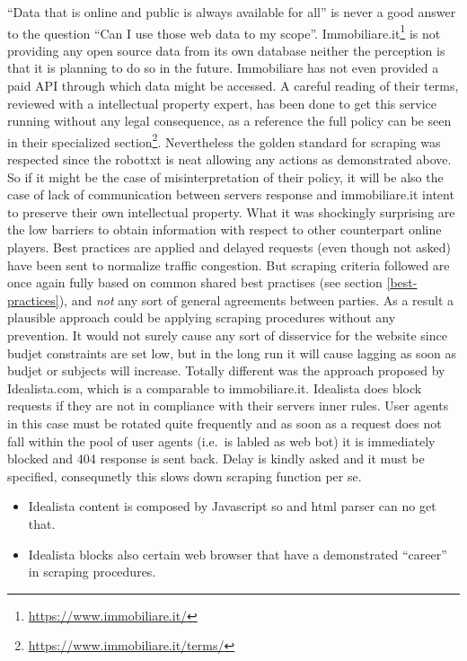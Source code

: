\documentclass[
  12pt,
  a4paper,
  oneside]{book}
\DeclareRobustCommand{\href}[2]{#2\footnote{\url{#1}}}
\providecommand{\tightlist}{%
  \setlength{\itemsep}{0pt}\setlength{\parskip}{0pt}}
\begin{document}
``Data that is online and public is always available for all'' is never a good answer to the question ``Can I use those web data to my scope''. \href{https://www.immobiliare.it/}{Immobiliare.it} is not providing any open source data from its own database neither the perception is that it is planning to do so in the future. Immobiliare has not even provided a paid API through which data might be accessed.
A careful reading of their terms, reviewed with a intellectual property expert, has been done to get this service running without any legal consequence, as a reference the full policy can be seen in their \href{https://www.immobiliare.it/terms/}{specialized section}. Nevertheless the golden standard for scraping was respected since the robottxt is neat allowing any actions as demonstrated above. So if it might be the case of misinterpretation of their policy, it will be also the case of lack of communication between servers response and immobiliare.it intent to preserve their own intellectual property.
What it was shockingly surprising are the low barriers to obtain information with respect to other counterpart online players. Best practices are applied and delayed requests (even though not asked) have been sent to normalize traffic congestion. But scraping criteria followed are once again fully based on common shared best practises (see section \ref{best-practices}), and \emph{not} any sort of general agreements between parties. As a result a plausible approach could be applying scraping procedures without any prevention. It would not surely cause any sort of disservice for the website since budjet constraints are set low, but in the long run it will cause lagging as soon as budjet or subjects will increase. Totally different was the approach proposed by Idealista.com, which is a comparable to immobiliare.it. Idealista does block requests if they are not in compliance with their servers inner rules. User agents in this case must be rotated quite frequently and as soon as a request does not fall within the pool of user agents (i.e.~is labled as web bot) it is immediately blocked and 404 response is sent back. Delay is kindly asked and it must be specified, consequnetly this slows down scraping function per se.

\begin{itemize}
\tightlist
\item
  Idealista content is composed by Javascript so and html parser can no get that.
\item
  Idealista blocks also certain web browser that have a demonstrated ``career'' in scraping procedures.
\end{itemize}
\end{document}
